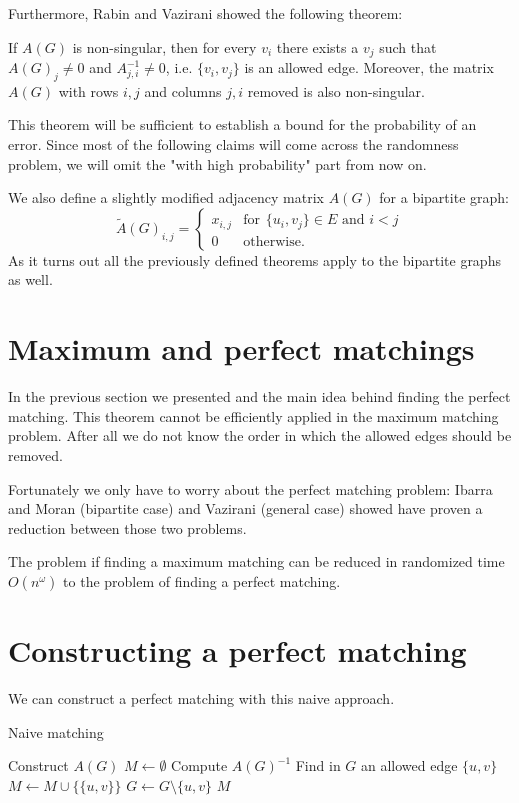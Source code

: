 Furthermore, Rabin and Vazirani \cite{rabin_vazirani} showed the following theorem:
\begin{theorem}\label{eliminating_allowed}
If $A(G)$ is non-singular, then for every $v_i$ there exists a $v_j$ such that $A(G)_j\not=0$ and $A^{-1}_{j,i}\not=0$, i.e. $\{v_i,v_j\}$ is an allowed edge. Moreover, the matrix $A(G)$ with rows $i,j$ and columns $j,i$ removed is also non-singular.
\end{theorem}
This theorem will be sufficient to establish a bound for the probability of an error. Since most of the following claims will come across the randomness problem, we will omit the "with high probability" part from now on.

We also define a slightly modified adjacency matrix $A(G)$ for a bipartite graph:
\[
\tilde A(G)_{i,j} =
\begin{cases} 
  x_{i,j} & \text{for}\hspace{5pt} \{u_i,v_j\} \in E \text{  and  } i<j \\
  0 & \text{otherwise}.
\end{cases}
\]
As it turns out all the previously defined theorems apply to the bipartite graphs as well.

\section{Maximum and perfect matchings}
In the previous section we presented  and the main idea behind finding the perfect matching. This theorem cannot be efficiently applied in the maximum matching problem. After all we do not know the order in which the allowed edges should be removed.

Fortunately we only have to worry about the perfect matching problem: Ibarra and Moran \cite{ibarra_moran} (bipartite case) and Vazirani \cite{rabin_vazirani} (general case) showed have proven a reduction between those two problems.
\begin{theorem}
The problem if finding a maximum matching can be reduced in randomized time $O(n^\omega)$ to the problem of finding a perfect matching.
\end{theorem}
\section{Constructing a perfect matching}
We can construct a perfect matching with this naive approach.
\begin{algorithm}
\caption{Naive matching}
\begin{algorithmic}[1]
\State Construct $A(G)$
\State $M \gets \emptyset$
    \State Compute $A(G)^{-1}$
    \State Find in $G$ an allowed edge $\{u,v\}$
    \State $M \gets M \cup \{ \{u,v\} \}$
    \State $G \gets G\setminus \{u,v\}$
\EndFor
\State \Return $M$
\EndFunction
\end{algorithmic}
\end{algorithm}

